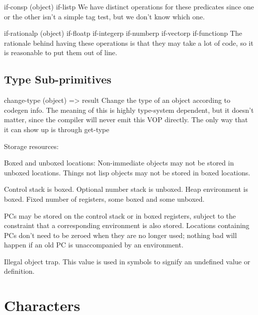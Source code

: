 if-consp (object)
if-listp
    We have distinct operations for these predicates since one or the other
    isn't a simple tag test, but we don't know which one.

if-rationalp (object)
if-floatp
if-integerp
if-numberp
if-vectorp
if-functionp
    The rationale behind having these operations is that they may take a lot of
    code, so it is reasonable to put them out of line.



\section{Type Sub-primitives}

change-type (object) => result
    Change the type of an object according to codegen info.  The meaning of
    this is highly type-system dependent, but it doesn't matter, since the
    compiler will never emit this VOP directly.  The only way that it can show
    up is through %
get-type


Storage resources:

Boxed and unboxed locations:
Non-immediate objects may not be stored in unboxed locations.
Things not lisp objects may not be stored in boxed locations.

Control stack is boxed.
Optional number stack is unboxed.
Heap environment is boxed.
Fixed number of registers, some boxed and some unboxed.

PCs may be stored on the control stack or in boxed registers, subject to the
constraint that a corresponding environment is also stored.  Locations
containing PCs don't need to be zeroed when they are no longer used; nothing
bad will happen if an old PC is unaccompanied by an environment.


\item[Trap]Illegal object trap.  This value is used in symbols to signify an
undefined value or definition.


\chapter{Characters}


